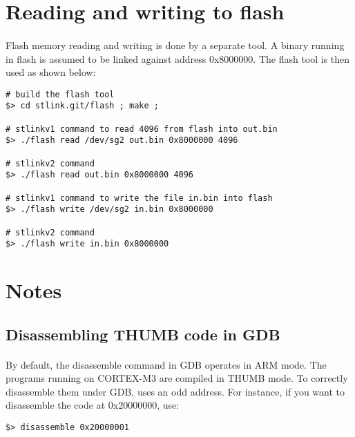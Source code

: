 \documentclass[a4paper, 11pt]{article}
\begin{document}
\newpage
\section{Reading and writing to flash}
\paragraph{}
Flash memory reading and writing is done by a separate tool. A binary running in flash is assumed to
be linked against address 0x8000000. The flash tool is then used as shown below:\\
\begin{small}
\begin{lstlisting}[frame=tb]
# build the flash tool
$> cd stlink.git/flash ; make ;

# stlinkv1 command to read 4096 from flash into out.bin
$> ./flash read /dev/sg2 out.bin 0x8000000 4096

# stlinkv2 command
$> ./flash read out.bin 0x8000000 4096

# stlinkv1 command to write the file in.bin into flash
$> ./flash write /dev/sg2 in.bin 0x8000000

# stlinkv2 command
$> ./flash write in.bin 0x8000000
\end{lstlisting}
\end{small}


\newpage
\section{Notes}

\subsection{Disassembling THUMB code in GDB}
\paragraph{}
By default, the disassemble command in GDB operates in ARM mode. The programs running on CORTEX-M3
are compiled in THUMB mode. To correctly disassemble them under GDB, uses an odd address. For instance,
if you want to disassemble the code at 0x20000000, use:\\
\begin{small}
\begin{lstlisting}[frame=tb]
$> disassemble 0x20000001
\end{lstlisting}
\end{small}
\end{document}
